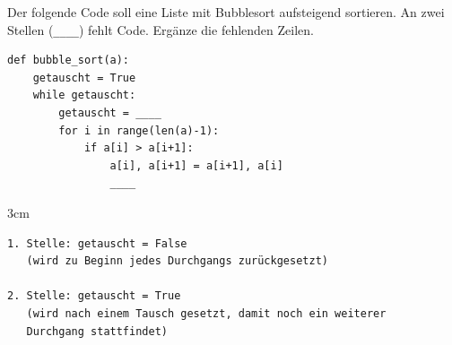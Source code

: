 \question[4]
Der folgende Code soll eine Liste mit Bubblesort aufsteigend sortieren. An zwei Stellen (\texttt{\_\_\_\_}) fehlt Code. Ergänze die fehlenden Zeilen.
\begin{lstlisting}
def bubble_sort(a):
    getauscht = True
    while getauscht:
        getauscht = ____
        for i in range(len(a)-1):
            if a[i] > a[i+1]:
                a[i], a[i+1] = a[i+1], a[i]
                ____
\end{lstlisting}

\begin{solutionbox}{3cm}
\begin{lstlisting}
1. Stelle: getauscht = False
   (wird zu Beginn jedes Durchgangs zurückgesetzt)

2. Stelle: getauscht = True
   (wird nach einem Tausch gesetzt, damit noch ein weiterer
   Durchgang stattfindet)
\end{lstlisting}
\end{solutionbox}